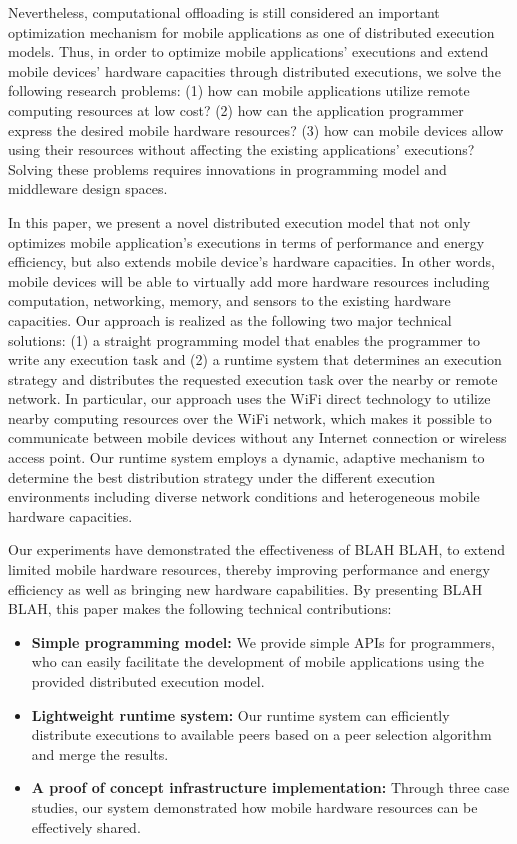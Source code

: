 \documentclass[conference]{IEEEtran}
\begin{document}
Nevertheless, computational offloading is still considered an important optimization mechanism for mobile applications as one of distributed execution models. Thus, in order to optimize mobile applications' executions and extend mobile devices' hardware capacities through distributed executions, we solve the following research problems: (1) how can mobile applications utilize remote computing resources at low cost? (2) how can the application programmer express the desired mobile hardware resources? (3) how can mobile devices allow using their resources without affecting the existing applications' executions? Solving these problems requires innovations in programming model and middleware design spaces. 

In this paper, we present a novel distributed execution model that not only optimizes mobile application's executions in terms of performance and energy efficiency, but also extends mobile device's hardware capacities. In other words, mobile devices will be able to virtually add more hardware resources including computation, networking, memory, and sensors to the existing hardware capacities. Our approach is realized as the following two major technical solutions: (1) a straight programming model that enables the programmer to write any execution task and (2) a runtime system that determines an execution strategy and distributes the requested execution task over the nearby or remote network. In particular, our approach uses the WiFi direct technology \cite{} to utilize nearby computing resources over the WiFi network, which makes it possible to communicate between mobile devices without any Internet connection or wireless access point. Our runtime system employs a dynamic, adaptive mechanism to determine the best distribution strategy under the different execution environments including diverse network conditions and heterogeneous mobile hardware capacities.

Our experiments have demonstrated the effectiveness of BLAH BLAH, to extend limited mobile hardware resources, thereby improving performance and energy efficiency as well as bringing new hardware capabilities. By presenting BLAH BLAH, this paper makes the following technical contributions:
\begin{itemize}
	\item \textbf{Simple programming model:} We provide simple APIs for programmers, who can easily facilitate the development of mobile applications using the provided distributed execution model.
	\item \textbf{Lightweight runtime system:} Our runtime system can efficiently distribute executions to available peers based on a peer selection algorithm and merge the results. 	
	\item \textbf{A proof of concept infrastructure implementation:} Through three case studies, our system demonstrated how mobile hardware resources can be effectively shared.
\end{itemize}
\end{document}
